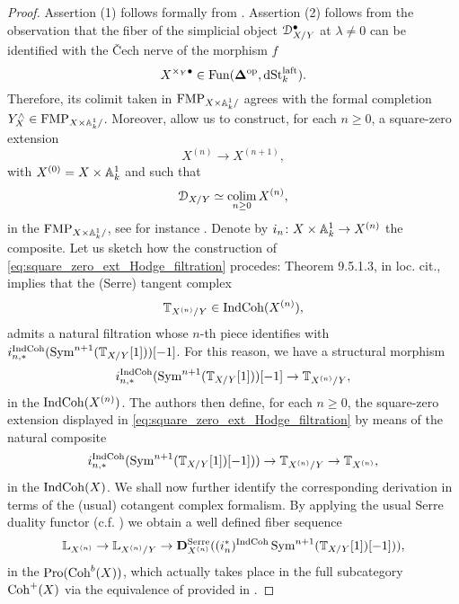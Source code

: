 \documentclass[10pt,a4paper,reqno]{amsart} %
\theoremstyle{plain}
\theoremstyle{definition}
\theoremstyle{remark}
\numberwithin{equation}{section}
\begin{document}
\begin{proof}
    Assertion (1) follows formally from \cite[\S 9, Proposition 2.3.6]{Gaitsgory_Study_II}. Assertion (2) follows from the observation that
    the fiber of the simplicial object $\mathcal D_{X/ Y}^\bullet$ at $\lambda \neq 0$ can be identified with the \v{C}ech nerve of the morphism $f$
        \[
            X^{\times_Y \bullet} \in \operatorname{Fun}(\bm{\Delta} ^\mathrm{op}, \mathrm{dSt}_k^{\mathrm{laft}}).
        \]
    Therefore, its colimit taken in $\mathrm{FMP}_{X \times \mathbb A^1_k/}$ agrees with the formal completion $Y^\wedge_X \in \mathrm{FMP}_{X \times \mathbb A^1_k/ }$. Moreover, \cite[\S 9, Theorem 5.1.3]{Gaitsgory_Study_II}
    allow us to construct, for each $n \ge 0$, a square-zero extension
        \begin{equation} \label{eq:square_zero_ext_Hodge_filtration}
            X^{(n)} \to X^{(n+1)},   
        \end{equation}
    with $X^{(0)} = X \times \mathbb A^1_k$ and such that
        \[\mathcal D_{X/ Y} \simeq \operatorname*{colim}_{n \ge 0} X^{(n)},\]
    in the \infcat $\mathrm{FMP}_{X \times \mathbb A^1_k/ }$, see for instance \cite[\S 9, Proposition 5.2.2]{Gaitsgory_Study_II}. Denote by $i_n \colon X \times \mathbb A^1_k \to X^{(n)}$
    the composite. Let us sketch how the construction of \eqref{eq:square_zero_ext_Hodge_filtration} procedes:
    Theorem 9.5.1.3, in loc. cit., implies that the (Serre) tangent complex
        \[
            \mathbb T_{X^{(n)}/ Y } \in \mathrm{Ind}\mathrm{Coh}(X^{(n)}),  
        \]
    admits a natural filtration whose $n$-th piece identifies with $i_{n, *}^\mathrm{IndCoh}(\operatorname{Sym}^{n+1}(\mathbb T_{X/Y}[1]))[-1]$. For this reason, we have a structural morphism
        \[
            i_{n, *}^\mathrm{IndCoh}(\operatorname{Sym}^{n+1}(\mathbb T_{X/Y}[1]))[-1] \to \mathbb T_{X^{(n)}/ Y},
        \]
    in the \infcat $\mathrm{Ind}\mathrm{Coh}(X^{(n)})$. The authors then define,
    for each $n \ge 0$, the square-zero extension displayed in \eqref{eq:square_zero_ext_Hodge_filtration} by means of the natural
    composite
        \[
            i_{n, *}^\mathrm{IndCoh}(  \operatorname{Sym}^{n+1}(\mathbb T_{X/ Y}[1])[-1])) \to \mathbb T_{X^{(n)}/ Y} \to \mathbb T_{X^{(n)}},
        \]
    in the \infcat $\mathrm{Ind}\mathrm{Coh}(X)$. We shall now further identify the corresponding derivation in terms of the (usual) cotangent complex formalism.
    By applying the usual Serre duality functor (c.f. \cite[\S 9]{Gaitsgory_IndCoh}) we obtain a well defined fiber sequence
        \[
            \mathbb L_{X^{(n)}} \to \mathbb L_{X^{(n)}/ Y} \to \mathbf D^{\mathrm{Serre}}_{X^{(n)}} ( (i_{n}^*)^{\mathrm{IndCoh}}  \operatorname{Sym}^{n+1}(\mathbb T_{X/ Y}[1])[-1])) ,
        \]
    in the \infcat $\mathrm{Pro}(\mathrm{Coh}^b(X))$, which actually takes place in the full subcategory $\mathrm{Coh}^+(X)$ via the equivalence of \infcats provided in \cite[Corollary 1.4.4.2]{Gaitsgory_Study_II}.

\end{proof}
\end{document}
